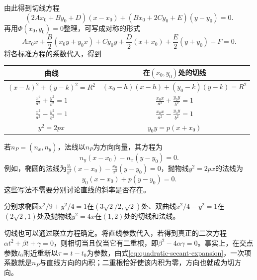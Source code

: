 由此得到切线方程
\begin{equation}\label{eq:quadratic-general-tangent}
 (2Ax_0+By_0+D)(x-x_0)+(Bx_0+2Cy_0+E)(y-y_0)=0.
\end{equation}
再用\(\Phi(x_0,y_0)=0\)整理，可写成对称的形式
\begin{equation}\label{eq:quadratic-symmetric-tangent}
 Ax_0x+\frac B2(x_0y+y_0x)+Cy_0y
 +\frac D2(x+x_0)+\frac E2(y+y_0)+F=0.
\end{equation}
将各标准方程的系数代入，得到
\begin{center}
\renewcommand{\arraystretch}{1.45}
\begin{tabular}{c|c}
曲线 & 在\((x_0,y_0)\)处的切线 \\ \hline
\((x-h)^2+(y-k)^2=R^2\) & \((x_0-h)(x-h)+(y_0-k)(y-k)=R^2\) \\
\(\frac{x^2}{a^2}+\frac{y^2}{b^2}=1\) & \(\frac{x_0x}{a^2}+\frac{y_0y}{b^2}=1\) \\
\(\frac{x^2}{a^2}-\frac{y^2}{b^2}=1\) & \(\frac{x_0x}{a^2}-\frac{y_0y}{b^2}=1\) \\
\(y^2=2px\) & \(y_0y=p(x+x_0)\)
\end{tabular}
\end{center}

若\(n_P=(n_x,n_y)\)，法线以\(n_P\)为方向向量，其方程为
\begin{equation}\label{eq:quadratic-general-normal}
 n_y(x-x_0)-n_x(y-y_0)=0.
\end{equation}
例如，椭圆的法线为\(\frac{y_0}{b^2}(x-x_0)-\frac{x_0}{a^2}(y-y_0)=0\)，抛物线\(y^2=2px\)的法线为
\begin{equation}\label{eq:quadratic-parabola-normal}
 y_0(x-x_0)+p(y-y_0)=0.
\end{equation}
这些写法不需要分别讨论直线的斜率是否存在。

\vspace{6pt}
\par\noindent\begin{minipage}{\linewidth}
\begin{example}
分别求椭圆\(x^2/9+y^2/4=1\)在\((3\sqrt2/2,\sqrt2)\)处、双曲线\(x^2/4-y^2=1\)在\((2\sqrt2,1)\)处及抛物线\(y^2=4x\)在\((1,2)\)处的切线和法线。
\end{example}
\end{minipage}\par
\vspace{6pt}

切线也可以通过联立方程确定。将直线参数代入，若得到真正的二次方程\(\alpha t^2+\beta t+\gamma=0\)，则相切当且仅当它有二重根，即\(\beta^2-4\alpha\gamma=0\)。事实上，在交点参数\(t_0\)附近重新以\(\tau=t-t_0\)为参数，由式\eqref{eq:quadratic-secant-expansion}，一次项系数就是\(n_P\)与直线方向的内积；二重根恰好使该内积为零，方向也就成为切方向。

